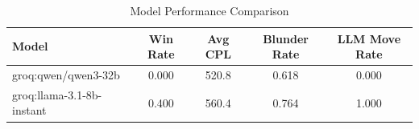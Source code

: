 \begin{table}[h]
\centering
\caption{Model Performance Comparison}
\begin{tabular}{lcccc}
\toprule
Model & Win Rate & Avg CPL & Blunder Rate & LLM Move Rate \\
\midrule
groq:qwen/qwen3-32b & 0.000 & 520.8 & 0.618 & 0.000 \\
groq:llama-3.1-8b-instant & 0.400 & 560.4 & 0.764 & 1.000 \\
\bottomrule
\end{tabular}
\end{table}